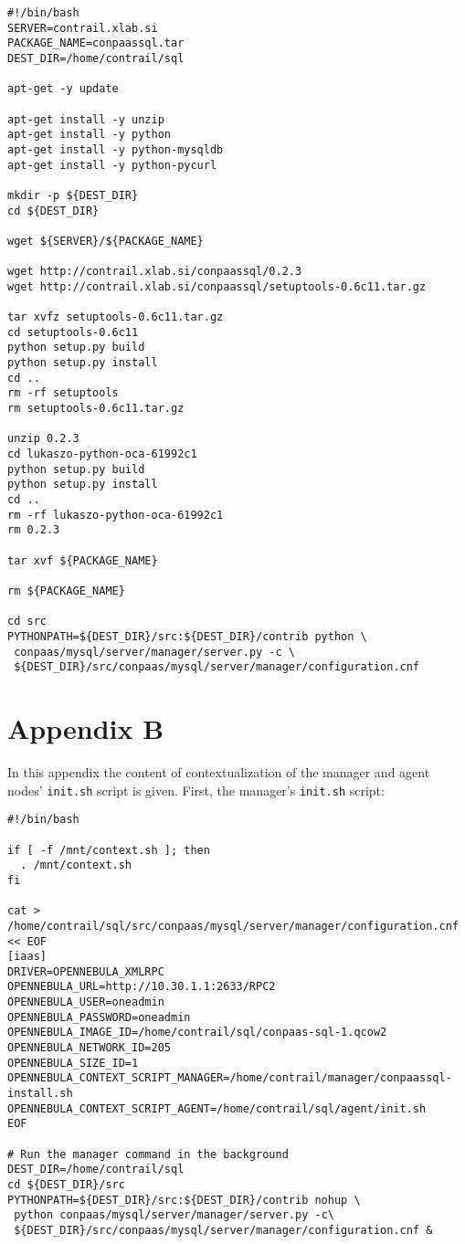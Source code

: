 \documentclass[a4paper,10pt]{article}
\begin{document}
\begin{Verbatim}[frame=single]
#!/bin/bash
SERVER=contrail.xlab.si
PACKAGE_NAME=conpaassql.tar
DEST_DIR=/home/contrail/sql

apt-get -y update

apt-get install -y unzip
apt-get install -y python
apt-get install -y python-mysqldb
apt-get install -y python-pycurl

mkdir -p ${DEST_DIR}
cd ${DEST_DIR}

wget ${SERVER}/${PACKAGE_NAME}

wget http://contrail.xlab.si/conpaassql/0.2.3
wget http://contrail.xlab.si/conpaassql/setuptools-0.6c11.tar.gz

tar xvfz setuptools-0.6c11.tar.gz
cd setuptools-0.6c11
python setup.py build
python setup.py install
cd ..
rm -rf setuptools
rm setuptools-0.6c11.tar.gz

unzip 0.2.3
cd lukaszo-python-oca-61992c1
python setup.py build
python setup.py install
cd ..
rm -rf lukaszo-python-oca-61992c1
rm 0.2.3

tar xvf ${PACKAGE_NAME}

rm ${PACKAGE_NAME}

cd src
PYTHONPATH=${DEST_DIR}/src:${DEST_DIR}/contrib python \
 conpaas/mysql/server/manager/server.py -c \
 ${DEST_DIR}/src/conpaas/mysql/server/manager/configuration.cnf

\end{Verbatim}

\newpage

\section{Appendix B}
\label{app:init}

In this appendix the content of contextualization of the manager and agent nodes' {\tt init.sh} script is given. First, the manager's {\tt init.sh} script:

\begin{Verbatim}[frame=single]
#!/bin/bash
 
if [ -f /mnt/context.sh ]; then
  . /mnt/context.sh
fi
 
cat > /home/contrail/sql/src/conpaas/mysql/server/manager/configuration.cnf << EOF
[iaas]
DRIVER=OPENNEBULA_XMLRPC
OPENNEBULA_URL=http://10.30.1.1:2633/RPC2
OPENNEBULA_USER=oneadmin
OPENNEBULA_PASSWORD=oneadmin
OPENNEBULA_IMAGE_ID=/home/contrail/sql/conpaas-sql-1.qcow2
OPENNEBULA_NETWORK_ID=205
OPENNEBULA_SIZE_ID=1
OPENNEBULA_CONTEXT_SCRIPT_MANAGER=/home/contrail/manager/conpaassql-install.sh
OPENNEBULA_CONTEXT_SCRIPT_AGENT=/home/contrail/sql/agent/init.sh
EOF

# Run the manager command in the background
DEST_DIR=/home/contrail/sql
cd ${DEST_DIR}/src
PYTHONPATH=${DEST_DIR}/src:${DEST_DIR}/contrib nohup \
 python conpaas/mysql/server/manager/server.py -c\
 ${DEST_DIR}/src/conpaas/mysql/server/manager/configuration.cnf &

\end{Verbatim}
\end{document}

